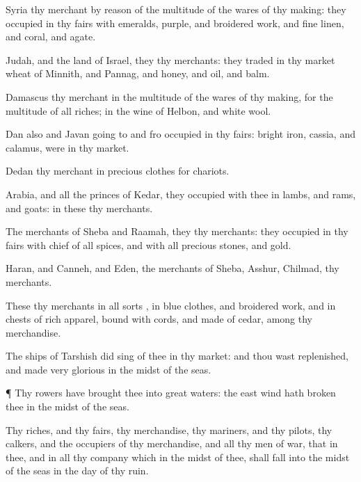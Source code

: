 {Syria
{} thy
merchant by reason of the
multitude of the wares of thy
making: they
occupied in thy
fairs with
emeralds,
purple, and broidered
work, and fine
linen, and
coral, and
agate.

Judah, and the
land of
Israel, they
{} thy
merchants: they
traded in thy
market
wheat of
Minnith, and
Pannag, and
honey, and
oil, and
balm.

Damascus
{} thy
merchant in the
multitude of the wares of thy
making, for the
multitude of all
riches; in the
wine of
Helbon, and
white
wool.

Dan also and
Javan going to and
fro
occupied in thy
fairs:
bright
iron,
cassia, and
calamus, were in thy
market.

Dedan
{} thy
merchant in
precious
clothes for
chariots.

Arabia, and all the
princes of
Kedar, they
occupied with
thee in
lambs, and
rams, and
goats: in these
{} thy
merchants.

The
merchants of
Sheba and
Raamah, they
{} thy
merchants: they
occupied in thy
fairs with
chief of all
spices, and with all
precious
stones, and
gold.

Haran, and
Canneh, and
Eden, the
merchants of
Sheba,
Asshur,
{}
Chilmad,
{} thy
merchants.

These
{} thy
merchants in all
sorts
{}, in
blue
clothes, and broidered
work, and in
chests of rich
apparel,
bound with
cords, and made of
cedar, among thy
merchandise.

The
ships of
Tarshish did
sing of thee in thy
market: and thou wast
replenished, and made
very
glorious in the
midst of the
seas.


\par }{\PP {}¶ Thy
rowers have
brought thee into
great
waters: the
east
wind hath
broken thee in the
midst of the
seas.

Thy
riches, and thy
fairs, thy
merchandise, thy
mariners, and thy
pilots, thy
calkers, and the
occupiers of thy
merchandise, and all thy
men of
war, that
{} in thee, and in all thy
company which
{} in the
midst of thee, shall
fall into the
midst of the
seas in the
day of thy
ruin.

}
